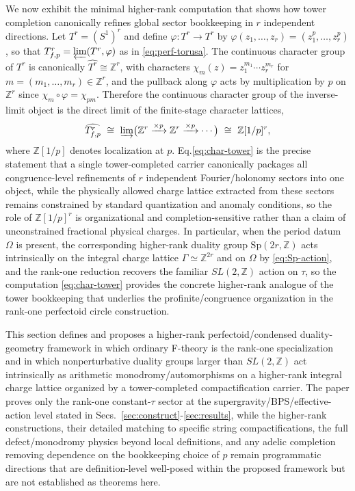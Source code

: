 \documentclass[11pt]{article}
\theoremstyle{remark}
\newcommand{\Z}{\mathbb{Z}}
\begin{document}
We now exhibit the minimal higher-rank computation that shows how tower completion canonically refines global sector bookkeeping in \(r\) independent directions. Let \(T^{r}=(S^{1})^{r}\) and define \(\varphi:T^{r}\to T^{r}\) by \(\varphi(z_{1},\ldots,z_{r})=(z_{1}^{p},\ldots,z_{r}^{p})\), so that \(T^{r}_{f,p}=\varprojlim (T^{r},\varphi)\) as in \eqref{eq:perf-torusa}. The continuous character group of \(T^{r}\) is canonically \(\widehat{T^{r}}\cong \Z^{r}\), with characters \(\chi_{m}(z)=z_{1}^{m_{1}}\cdots z_{r}^{m_{r}}\) for \(m=(m_{1},\ldots,m_{r})\in \Z^{r}\), and the pullback along \(\varphi\) acts by multiplication by \(p\) on \(\Z^{r}\) since \(\chi_{m}\circ \varphi=\chi_{pm}\). Therefore the continuous character group of the inverse-limit object is the direct limit of the finite-stage character lattices,
\begin{equation}\label{eq:char-tower}
\widehat{T^{r}_{f,p}}\ \cong\ \varinjlim\bigl(\Z^{r}\xrightarrow{\times p}\Z^{r}\xrightarrow{\times p}\cdots\bigr)\ \cong\ \Z[1/p]^{r},
\end{equation}
where \(\Z[1/p]\) denotes localization at \(p\). Eq.\eqref{eq:char-tower} is the precise statement that a single tower-completed carrier canonically packages all congruence-level refinements of \(r\) independent Fourier/holonomy sectors into one object, while the physically allowed charge lattice extracted from these sectors remains constrained by standard quantization and anomaly conditions, so the role of \(\Z[1/p]^{r}\) is organizational and completion-sensitive rather than a claim of unconstrained fractional physical charges. In particular, when the period datum \(\Omega\) is present, the corresponding higher-rank duality group \(\mathrm{Sp}(2r,\Z)\) acts intrinsically on the integral charge lattice \(\Gamma\simeq \Z^{2r}\) and on \(\Omega\) by \eqref{eq:Sp-action}, and the rank-one reduction recovers the familiar \(SL(2,\Z)\) action on \(\tau\), so the computation \eqref{eq:char-tower} provides the concrete higher-rank analogue of the tower bookkeeping that underlies the profinite/congruence organization in the rank-one perfectoid circle construction.

This section defines and proposes a higher-rank perfectoid/condensed duality-geometry framework in which ordinary F-theory is the rank-one specialization and in which nonperturbative duality groups larger than \(SL(2,\Z)\) act intrinsically as arithmetic monodromy/automorphisms on a higher-rank integral charge lattice organized by a tower-completed compactification carrier. The paper proves only the rank-one constant-\(\tau\) sector at the supergravity/BPS/effective-action level stated in Secs.~\ref{sec:construct}-\ref{sec:results}, while the higher-rank constructions, their detailed matching to specific string compactifications, the full defect/monodromy physics beyond local definitions, and any adelic completion removing dependence on the bookkeeping choice of \(p\) remain programmatic directions that are definition-level well-posed within the proposed framework but are not established as theorems here.
\end{document}
